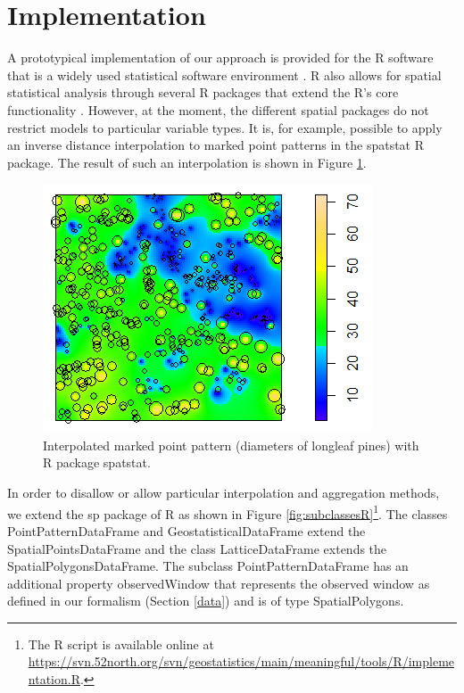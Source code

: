 \documentclass[final,authoryear,1p,times]{elsarticle}
\begin{document}
\section{Implementation} \label{implementation}

A prototypical implementation of our approach is provided for the R software that is a widely used statistical software environment \citep{R}. R also allows for spatial statistical analysis through several R packages that extend the R's core functionality \citep{Bivand2008}. However, at the moment, the different spatial packages do not restrict models to particular variable types. It is, for example, possible to apply an inverse distance interpolation to marked point patterns in the spatstat R package. The result of such an interpolation is shown in Figure \ref{fig:llpinesIdw}. 

\begin{figure}[ht]
	\centering
		\includegraphics[scale=0.7]{llpines_idw.png}
	\caption{Interpolated marked point pattern (diameters of longleaf pines) with R package spatstat.}
	\label{fig:llpinesIdw}
\end{figure}

In order to disallow or allow particular interpolation and aggregation methods, we extend the sp package of R \citep{Pebesma2005} as shown in Figure \ref{fig:subclassesR}\footnote{The R script is available online at \url{https://svn.52north.org/svn/geostatistics/main/meaningful/tools/R/implementation.R}.}. The classes PointPatternDataFrame and GeostatisticalDataFrame extend the SpatialPointsDataFrame and the class LatticeDataFrame extends the SpatialPolygonsDataFrame. The subclass PointPatternDataFrame has an additional property observedWindow that represents the observed window as defined in our formalism (Section \ref{data}) and is of type SpatialPolygons. 
\end{document}
